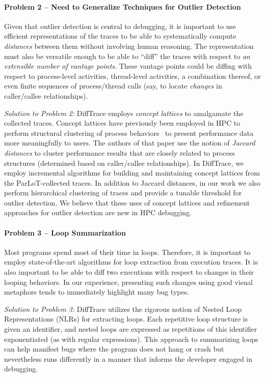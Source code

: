 \paragraph{Problem 2 -- Need to Generalize Techniques for Outlier Detection\/}
Given that outlier detection is central to debugging,
it is important to use efficient representations of the traces
to be able to systematically compute
{\em distances} between them without
involving human reasoning.
%
The representation must also be versatile enough to
be able to ``diff'' the traces
with respect to {\em an extensible number of vantage points}.
%
These vantage points could be diffing with respect to process-level activities,
thread-level activities, a combination thereof,
or even finite sequences of process/thread calls (say, to locate {\em changes}
in caller/callee relationships).


{\em Solution to Problem 2:\/}
DiffTrace employs {\em concept lattices} to amalgamate the collected traces.
%
Concept lattices have previously been employed in HPC to perform structural
clustering of process behaviors~\cite{weber-cl} to present performance data more
meaningfully to users.
%
The authors of that paper use the notion of {\em Jaccard distances}
to cluster performance results that are closely related to process structures
(determined based on caller/callee relationships).
%
In DiffTrace, we employ incremental algorithms for building and maintaining
concept lattices from the ParLoT-collected traces.
%
In addition to Jaccard distances, in our work we also perform hierarchical
clustering of traces and provide a tunable threshold for outlier detection.
%
We believe that these uses of concept lattices and refinement approaches
for outlier detection are new in HPC debugging.


\paragraph{Problem 3 -- Loop Summarization\/}
Most programs spend most of their time in loops.
%
Therefore, it is important to employ state-of-the-art algorithms for
loop extraction from execution traces.
%
It is also important
to be able to diff two executions with respect to changes in their looping behaviors.
%
In our experience, presenting such changes using good visual metaphors
tends to immediately highlight many bug types.


{\em Solution to Problem 3:\/}
DiffTrace utilizes the rigorous notion of Nested Loop Representations (NLRs) for
extracting loops.
%
Each repetitive loop structure is given an identifier, and nested loops are
expressed as repetitions of this identifier exponentiated (as with regular
expressions).
%
This approach to summarizing loops can help manifest
bugs where the program does not hang or crash but nevertheless
runs differently in a manner that informs the developer engaged in debugging.

